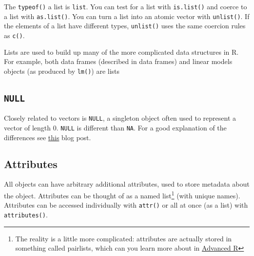 \documentclass[]{book}
\newenvironment{Shaded}{\begin{snugshade}}{\end{snugshade}}
\newcommand{\CommentTok}[1]{\textcolor[rgb]{0.56,0.35,0.01}{\textit{#1}}}
\newcommand{\DecValTok}[1]{\textcolor[rgb]{0.00,0.00,0.81}{#1}}
\newcommand{\FloatTok}[1]{\textcolor[rgb]{0.00,0.00,0.81}{#1}}
\newcommand{\KeywordTok}[1]{\textcolor[rgb]{0.13,0.29,0.53}{\textbf{#1}}}
\newcommand{\NormalTok}[1]{#1}
\newcommand{\OperatorTok}[1]{\textcolor[rgb]{0.81,0.36,0.00}{\textbf{#1}}}
\newcommand{\StringTok}[1]{\textcolor[rgb]{0.31,0.60,0.02}{#1}}
\let\rmarkdownfootnote\footnote%
\def\footnote{\protect\rmarkdownfootnote}
\theoremstyle{definition}
\theoremstyle{definition}
\theoremstyle{definition}
\theoremstyle{remark}
\begin{document}
The \texttt{typeof()} a list is \texttt{list}. You can test for a list
with \texttt{is.list()} and coerce to a list with \texttt{as.list()}.
You can turn a list into an atomic vector with \texttt{unlist()}. If the
elements of a list have different types, \texttt{unlist()} uses the same
coercion rules as \texttt{c()}.

Lists are used to build up many of the more complicated data structures
in R. For example, both data frames (described in data frames) and
linear models objects (as produced by \texttt{lm()}) are lists

\hypertarget{null}{%
\subsection{\texorpdfstring{\texttt{NULL}}{NULL}}\label{null}}

Closely related to vectors is \texttt{NULL}, a singleton object often
used to represent a vector of length 0. \texttt{NULL} is different than
\texttt{NA}. For a good explanation of the differences see
\href{https://www.r-bloggers.com/r-na-vs-null/}{this} blog post.

\hypertarget{attributes}{%
\subsection{Attributes}\label{attributes}}

All objects can have arbitrary additional attributes, used to store
metadata about the object. Attributes can be thought of as a named
list\footnote{The reality is a little more complicated: attributes are
  actually stored in something called pairlists, which can you learn
  more about in \href{http://adv-r.had.co.nz}{Advanced R}} (with unique
names). Attributes can be accessed individually with \texttt{attr()} or
all at once (as a list) with \texttt{attributes()}.

\begin{Shaded}
\end{Shaded}
\end{document}
